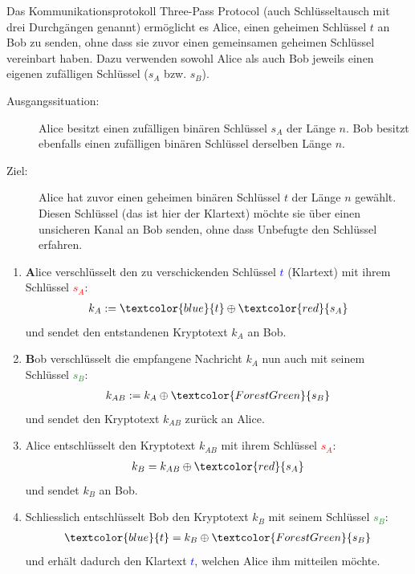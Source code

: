 \begin{myprocedure}\label{myprocedure:Komm}
	Das Kommunikationsprotokoll Three-Pass Protocol (auch Schlüsseltausch mit drei Durchgängen genannt) ermöglicht es Alice, einen geheimen Schlüssel $t$ an Bob zu senden, ohne dass sie zuvor einen gemeinsamen geheimen Schlüssel vereinbart haben. Dazu verwenden sowohl Alice als auch Bob jeweils einen eigenen zufälligen Schlüssel ($s_A$ bzw. $s_B$).

	\begin{description}
		\item[Ausgangssituation:] Alice besitzt einen zufälligen binären Schlüssel $s_A$ der Länge $n$. Bob besitzt ebenfalls einen zufälligen binären Schlüssel derselben Länge $n$.
		\item[Ziel:] Alice hat zuvor einen geheimen binären Schlüssel $t$ der Länge $n$ gewählt. Diesen Schlüssel (das ist hier der Klartext) möchte sie über einen unsicheren Kanal an Bob senden, ohne dass Unbefugte den Schlüssel erfahren.
	\end{description}
	\begin{enumerate}
		\item \textbf{A}lice verschlüsselt den zu verschickenden Schlüssel \textcolor{blue}{$t$} (Klartext) mit ihrem Schlüssel \textcolor{red}{$s_A$}:
		      \begin{align*}
			      k_A := \textcolor{blue}{t} \oplus \textcolor{red}{s_A}
		      \end{align*}
		      und sendet den entstandenen Kryptotext $k_A$ an Bob.
		\item \textbf{B}ob verschlüsselt die empfangene Nachricht $k_A$ nun auch mit seinem Schlüssel \textcolor{ForestGreen}{$s_B$}:
		      \begin{align*}
			      k_{AB} := k_A \oplus \textcolor{ForestGreen}{s_B}
		      \end{align*}
		      und sendet den Kryptotext $k_{AB}$ zurück an Alice.
		\item Alice entschlüsselt den Kryptotext $k_{AB}$ mit ihrem Schlüssel \textcolor{red}{$s_A$}:
		      \begin{align*}
			      k_B = k_{AB} \oplus \textcolor{red}{s_A}
		      \end{align*}
		      und sendet $k_B$ an Bob.
		\item Schliesslich entschlüsselt Bob den Kryptotext $k_B$ mit seinem Schlüssel \textcolor{ForestGreen}{$s_B$}:
		      \begin{align*}
			      \textcolor{blue}{t} = k_B \oplus \textcolor{ForestGreen}{s_B}
		      \end{align*}
		      und erhält dadurch den Klartext \textcolor{blue}{$t$}, welchen Alice ihm mitteilen möchte.
	\end{enumerate}
\end{myprocedure}
